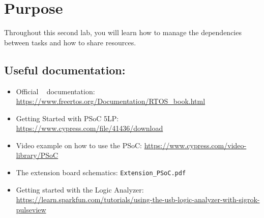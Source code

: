 \section*{Purpose}

Throughout this second lab, you will learn how to manage the dependencies between tasks and how to share resources.
 
\subsection*{Useful documentation:}
\begin{itemize}
    \item Official \rtos~ documentation: \url{https://www.freertos.org/Documentation/RTOS_book.html}
    \item Getting Started with PSoC 5LP: \url{https://www.cypress.com/file/41436/download}
    \item Video example on how to use the PSoC: \url{https://www.cypress.com/video-library/PSoC}
    \item The extension board schematics: \texttt{Extension\_PSoC.pdf}
		\item Getting started with the Logic Analyzer: \url{https://learn.sparkfun.com/tutorials/using-the-usb-logic-analyzer-with-sigrok-pulseview}
\end{itemize}